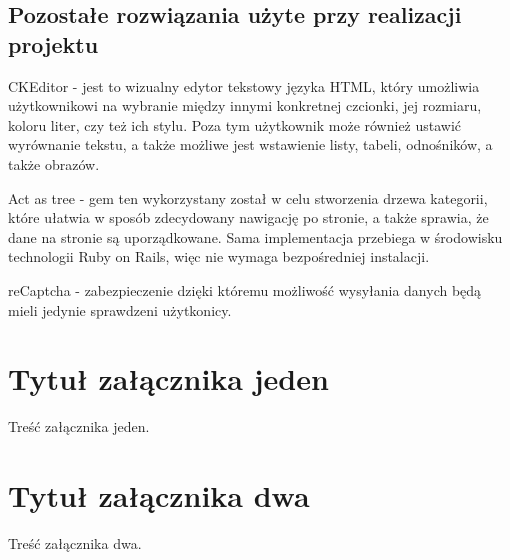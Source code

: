 \documentclass[brudnopis]{xmgr}
\begin{document}
\section{Pozostałe rozwiązania użyte przy realizacji projektu}

CKEditor - jest to wizualny edytor tekstowy języka HTML, który umożliwia użytkownikowi na wybranie między innymi konkretnej 
czcionki, jej rozmiaru, koloru liter, czy też ich stylu. Poza tym użytkownik może również ustawić wyrównanie tekstu,
a także możliwe jest wstawienie listy, tabeli, odnośników, a także obrazów.

Act as tree - gem ten wykorzystany został w celu stworzenia drzewa kategorii, które ułatwia w sposób zdecydowany nawigację
po stronie, a także sprawia, że dane na stronie są uporządkowane. Sama implementacja przebiega w środowisku
technologii Ruby on Rails, więc nie wymaga bezpośredniej instalacji.

reCaptcha - zabezpieczenie dzięki któremu możliwość wysyłania danych będą mieli jedynie sprawdzeni użytkonicy.

\summary

\appendix
\chapter{Tytuł załącznika jeden}

Treść załącznika jeden.

\chapter{Tytuł załącznika dwa}

Treść załącznika dwa.




\listoftables

\listoffigures

\oswiadczenie
\end{document}

